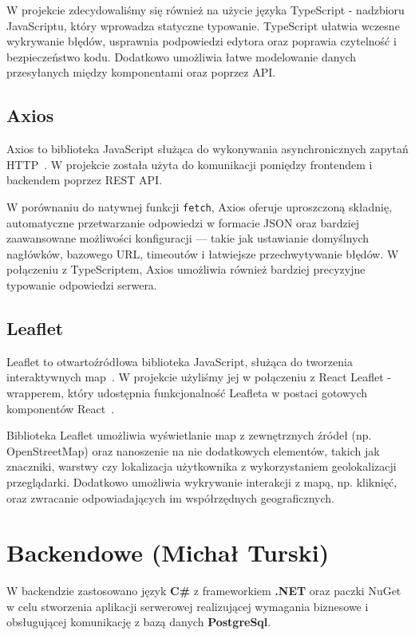 W projekcie zdecydowaliśmy się również na użycie języka TypeScript - nadzbioru JavaScriptu, który wprowadza statyczne typowanie. TypeScript ułatwia wczesne wykrywanie błędów, usprawnia podpowiedzi edytora oraz poprawia czytelność i bezpieczeństwo kodu. Dodatkowo umożliwia łatwe modelowanie danych przesyłanych między komponentami oraz poprzez API.

\subsection{Axios}

Axios to biblioteka JavaScript służąca do wykonywania asynchronicznych zapytań HTTP~\cite{axios-docs}. W projekcie została użyta do komunikacji pomiędzy frontendem i backendem poprzez REST API.

W porównaniu do natywnej funkcji \texttt{fetch}, Axios oferuje uproszczoną składnię, automatyczne przetwarzanie odpowiedzi w formacie JSON oraz bardziej zaawansowane możliwości konfiguracji — takie jak ustawianie domyślnych nagłówków, bazowego URL, timeoutów i łatwiejsze przechwytywanie błędów. W połączeniu z TypeScriptem, Axios umożliwia również bardziej precyzyjne typowanie odpowiedzi serwera.

\subsection{Leaflet}

Leaflet to otwartoźródłowa biblioteka JavaScript, służąca do tworzenia interaktywnych map~\cite{leaflet-docs}. W projekcie użyliśmy jej w połączeniu z React Leaflet - wrapperem, który udostępnia funkcjonalność Leafleta w postaci gotowych komponentów React~\cite{react-leaflet-docs}.

Biblioteka Leaflet umożliwia wyświetlanie map z zewnętrznych źródeł (np. OpenStreetMap) oraz nanoszenie na nie dodatkowych elementów, takich jak znaczniki, warstwy czy lokalizacja użytkownika z wykorzystaniem geolokalizacji przeglądarki. Dodatkowo umożliwia wykrywanie interakcji z mapą, np. kliknięć, oraz zwracanie odpowiadających im współrzędnych geograficznych.

\section{Backendowe (Michał Turski)}

W backendzie zastosowano język \textbf{C\#} z frameworkiem \textbf{.NET} oraz paczki NuGet w celu stworzenia aplikacji serwerowej realizującej wymagania biznesowe i obsługującej komunikację z bazą danych \textbf{PostgreSql}.


